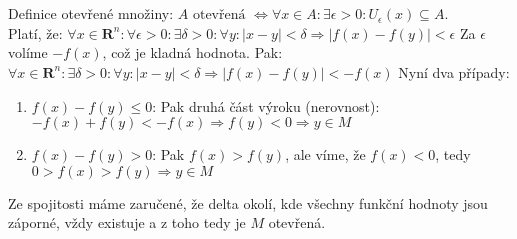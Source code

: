 \documentclass[a4paper]{article}
\begin{document}
\section{}
Definice otevřené množiny: $A \text{ otevřená } \Leftrightarrow \forall x\in A: \exists \epsilon >0: U_\epsilon(x) \subseteq A$. \\
Platí, že: $\forall x \in \mathbf{R}^n: \forall \epsilon >0: \exists \delta > 0: \forall y: |x-y| < \delta \Rightarrow |f(x)-f(y)|<\epsilon$ Za $\epsilon$ volíme $-f(x)$, což je kladná hodnota. Pak:
$\forall x \in \mathbf{R}^n: \exists \delta > 0: \forall y: |x-y| < \delta \Rightarrow |f(x)-f(y)|<-f(x)$ Nyní dva případy:
\begin{enumerate}
	\item $f(x)-f(y)\le 0$: Pak druhá část výroku (nerovnost): $-f(x)+f(y)<-f(x) \Rightarrow f(y) < 0 \Rightarrow y \in M$
	\item $f(x)-f(y) > 0$: Pak $f(x) > f(y)$, ale víme, že $f(x) < 0$, tedy $0 > f(x) > f(y) \Rightarrow y \in M$  
\end{enumerate}
Ze spojitosti máme zaručené, že delta okolí, kde všechny funkční hodnoty jsou záporné, vždy existuje a z toho tedy je $M$ otevřená.
\end{document}
